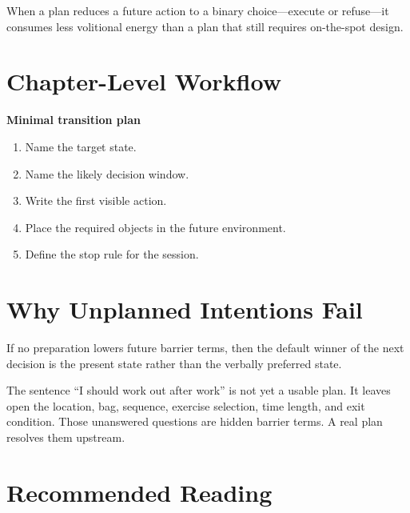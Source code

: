 \begin{proposition}
When a plan reduces a future action to a binary choice---execute or refuse---it
consumes less volitional energy than a plan that still requires on-the-spot
design.
\end{proposition}

\section{Chapter-Level Workflow}

\begin{templatebox}
\textbf{Minimal transition plan}
\begin{enumerate}[nosep]
  \item Name the target state.
  \item Name the likely decision window.
  \item Write the first visible action.
  \item Place the required objects in the future environment.
  \item Define the stop rule for the session.
\end{enumerate}
\end{templatebox}

\section{Why Unplanned Intentions Fail}

\begin{corollary}
If no preparation lowers future barrier terms, then the default winner of the
next decision is the present state rather than the verbally preferred state.
\end{corollary}

\begin{example}
The sentence ``I should work out after work'' is not yet a usable plan.
It leaves open the location, bag, sequence, exercise selection, time length,
and exit condition. Those unanswered questions are hidden barrier terms. A
real plan resolves them upstream.
\end{example}

\section{Recommended Reading}

